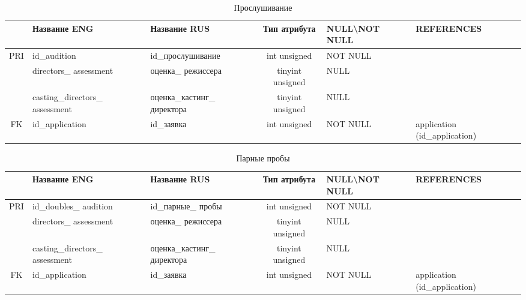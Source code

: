 \documentclass[11pt,a4paper,final]{article} %
\begin{document}
\begin{table}[H]
	\centering
	\begin{tabular}{|c|p{3cm}|p{3cm}|c|p{2cm}|p{2.6cm}|}
		\hline
		& Название ENG & Название RUS & Тип атрибута & NULL\textbackslash \newline NOT NULL & REFERENCES \\
		\hline
		PRI & id\_audition & id\_прослушивание & int unsigned & NOT NULL &  \\
		\hline
		& directors\_ \newline assessment & оценка\_ \newline режиссера & tinyint unsigned & NULL & \\
		\hline
		& casting\_directors\_ \newline assessment & оценка\_кастинг\_ \newline директора & tinyint unsigned & NULL & \\
		\hline
		FK & id\_application & id\_заявка & int unsigned & NOT NULL & application (id\_application) \\
		\hline
	\end{tabular}
	\caption{Прослушивание}
	\label{tab:audition}
\end{table}	


\begin{table}[H]
	\centering
	\begin{tabular}{|c|p{3cm}|p{3cm}|c|p{2cm}|p{2.6cm}|}
		\hline
		& Название ENG & Название RUS & Тип атрибута & NULL\textbackslash \newline NOT NULL & REFERENCES \\
		\hline
		PRI & id\_doubles\_ \newline audition & id\_парные\_ \newline пробы & int unsigned & NOT NULL &  \\
		\hline
		& directors\_ \newline assessment & оценка\_ \newline режиссера & tinyint unsigned & NULL & \\
		\hline
		& casting\_directors\_ \newline assessment & оценка\_кастинг\_ \newline директора & tinyint unsigned & NULL & \\
		\hline
		FK & id\_application & id\_заявка & int unsigned & NOT NULL & application (id\_application) \\ 
		\hline
	\end{tabular}
	\caption{Парные пробы}
	\label{tab:doubaudition}
\end{table}	
\end{document}
